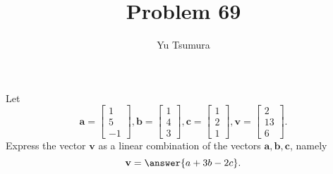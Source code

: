 \documentclass{ximera}
\title{Problem 69}
\author{Yu Tsumura}
\begin{document}
\begin{problem}
	 
	Let
	\[\mathbf{a}=\begin{bmatrix}
	  1 \\
	   5 \\
	    -1 
	  \end{bmatrix}, \mathbf{b}=\begin{bmatrix}
	  1 \\
	   4 \\
	    3 
	  \end{bmatrix}, \mathbf{c}=\begin{bmatrix}
	  1 \\
	   2 \\
	    1 
	  \end{bmatrix}, \mathbf{v}=\begin{bmatrix}
	  2 \\
	   13 \\
	    6 
	  \end{bmatrix}.\]
        Express the vector $\mathbf{v}$ as a linear combination of the vectors $\mathbf{a}, \mathbf{b}, \mathbf{c}$, namely
        \[
          \mathbf{v} = \answer{a + 3b - 2c}.
        \]

\end{problem}

	
\end{document}
